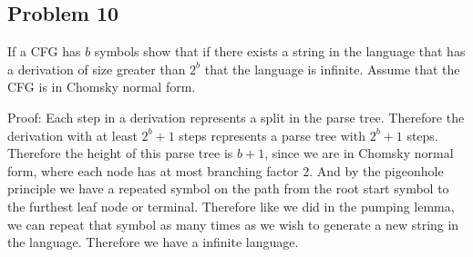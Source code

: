 \documentclass[english]{article}
\begin{document}
\subsection*{Problem 10}
If a CFG has $b$ symbols show that if there exists a string in the language that has a derivation of size greater than $2^b$ that
the language is infinite. Assume that the CFG is in Chomsky normal form.

Proof: Each step in a derivation represents a split in the parse tree. Therefore the derivation with at least $2^b + 1$ steps
represents a parse tree with $2^b + 1$ steps. Therefore the height of this parse tree is $b+1$, since we are in Chomsky normal
form, where each node has at most branching factor 2. And by the pigeonhole principle
we have a repeated symbol on the path from the root start symbol to the furthest leaf node or terminal. Therefore like we did
in the pumping lemma, we can repeat that symbol as many times as we wish to generate a new string in the language. Therefore we
have a infinite language.
 
\end{document}

